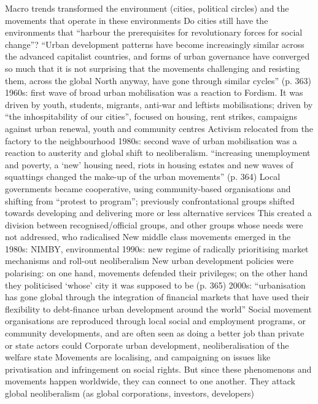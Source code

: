 \documentclass{article}
\begin{document}
\begin{outline}
	\1 Macro trends transformed the environment (cities, political circles) and the movements that operate in these environments 
	\1 Do cities still have the environments that ``harbour the prerequisites for revolutionary forces for social change''? 
	\1 ``Urban development patterns have become increasingly similar across the advanced capitalist countries, and forms of urban governance have converged so much that it is not surprising that the movements challenging and resisting them, across the global North anyway, have gone through similar cycles'' (p. 363)
	\1 1960s: first wave of broad urban mobilisation was a reaction to Fordism. It was driven by youth, students, migrants, anti-war and leftists mobilisations; driven by ``the inhospitability of our cities'', focused on housing, rent strikes, campaigns against urban renewal, youth and community centres
		\2 Activism relocated from the factory to the neighbourhood
	\1 1980s: second wave of urban mobilisation was a reaction to austerity and global shift to neoliberalism.
		\2 ``increasing unemployment and poverty, a `new' housing  need, riots in housing estates and new waves of squattings changed the make-up of the urban movements'' (p. 364)
		\2 Local governments became cooperative, using community-based organisations and shifting from ``protest to program''; previously confrontational groups shifted towards developing and delivering more or less alternative services
		\2 This created a division between recognised/official groups, and other groups whose needs were not addressed, who radicalised
		\2 New middle class movements emerged in the 1980s: NIMBY, environmental
	\1 1990s: new regime of radically prioritising market mechanisms and roll-out neoliberalism
		\2 New urban development policies were polarising: on one hand, movements defended their privileges; on the other hand they politicised `whose' city it was supposed to be (p. 365)
	\1 2000s: ``urbanisation has gone global through the integration of financial markets that have used their flexibility to debt-finance urban development around the world''
		\2 Social movement organisations are reproduced through local social and employment programs, or community developments, and are often seen as doing a better job than private or state actors could
		\2 Corporate urban development, neoliberalisation of the welfare state
		\2 Movements are localising, and campaigning on issues like privatisation and infringement on social rights. But since these phenomenons and movements happen worldwide, they can connect to one another. They attack global neoliberalism (as global corporations, investors, developers)

\end{outline}
\end{document}
